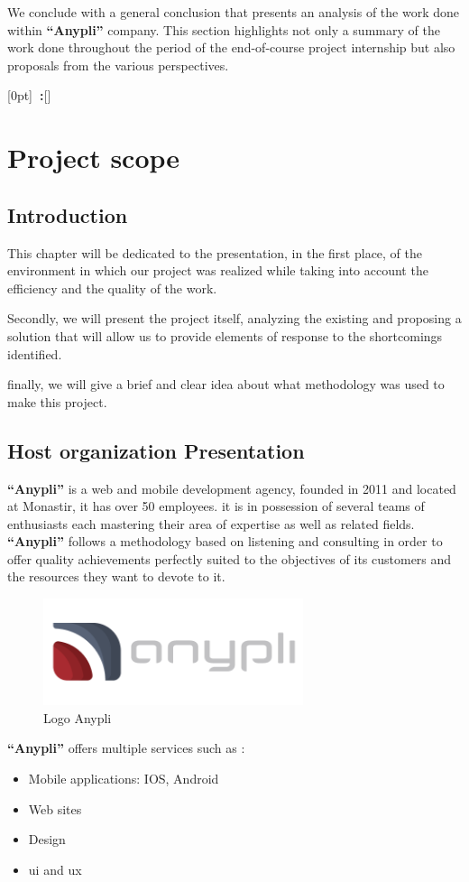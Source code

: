 \documentclass[12pt,a4paper]{report}
\newcommand{\setupname}[1][\chaptername]{
	\titlecontents{chapter}[0pt]{\vspace{1ex}}{\bfseries#1~\thecontentslabel:\quad}{\bfseries}{\bfseries\hfill\contentspage}[]
}
\begin{document}
	We conclude with a general conclusion that presents an analysis of the work done within \textbf{``Anypli''} company. This section highlights not only a summary of the work done throughout the period of the end-of-course project internship but also proposals from the various perspectives.\par
	
	\pagestyle{fancy}
	\fancyhf{}
	\fancyhead[LE,RO]{\leftmark}
	\fancyfoot[CE,CO]{\thepage}
	\renewcommand{\footrulewidth}{0.4pt}
	\setupname
	\chapter{Project scope }
	\section*{Introduction}
	This chapter will be dedicated to the presentation, in the first place, of the environment in which our project was realized while taking into account the efficiency and the quality of the work.\par
	Secondly, we will present the project itself, analyzing the existing and proposing a solution that will allow us to provide elements of response to the shortcomings identified.\par
	finally, we will give a brief and clear idea about what methodology was used to make this project.
	\section{Host organization Presentation}
	\textbf{``Anypli''} is a web and mobile development agency, founded in 2011 and located at Monastir, it has over 50 employees. it is in possession of several teams of enthusiasts each mastering their area of expertise as well as related fields. \textbf{``Anypli''} follows a methodology based on listening and consulting in order to offer quality achievements perfectly suited to the objectives of its customers and the resources they want to devote to it. \par
	\begin{figure}[H]
		\centering
		\includegraphics[width=3in,keepaspectratio]{logo_anypli.png}
		\caption{Logo Anypli}
		
	\end{figure}
	\textbf{``Anypli''} offers multiple services such as :
	\begin{itemize}
		\item Mobile applications: IOS, Android
		\item Web sites
		\item Design
		\item \ac{ui} and \ac{ux}
		
	\end{itemize}
\end{document}
